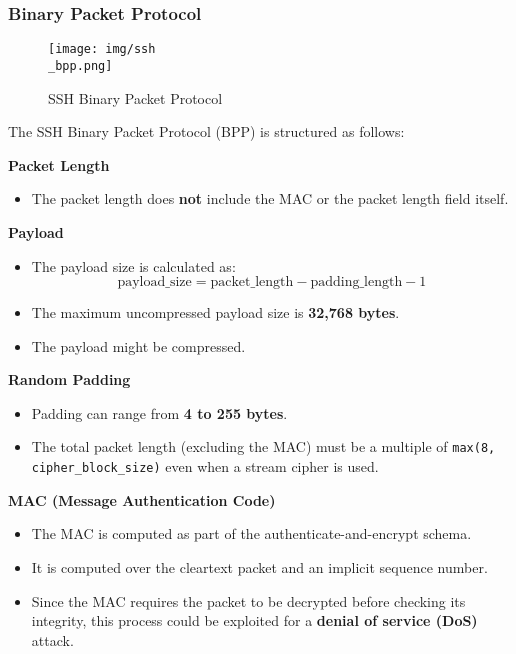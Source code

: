 \subsubsection{Binary Packet Protocol}
\begin{figure}[ht]
    \centering
    \texttt{[image: img/ssh\\\_bpp.png]}
    \caption{SSH Binary Packet Protocol}
    \label{fig:ssh-bpp}
\end{figure}

The SSH Binary Packet Protocol (BPP) is structured as follows:

\textbf{Packet Length}
\begin{itemize}
    \item The packet length does \textbf{not} include the MAC or the packet length field itself.
\end{itemize}

\textbf{Payload}
\begin{itemize}[itemsep=0pt]
    \item The payload size is calculated as:
    \[
    \text{payload\_size} = \text{packet\_length} - \text{padding\_length} - 1
    \]
    \item The maximum uncompressed payload size is \textbf{32,768 bytes}.
    \item The payload might be compressed.
\end{itemize}

\textbf{Random Padding}
\begin{itemize}
    \item Padding can range from \textbf{4 to 255 bytes}.
    \item The total packet length (excluding the MAC) must be a multiple of \texttt{max(8, cipher\_block\_size)} even when a stream cipher is used.
\end{itemize}

\textbf{MAC (Message Authentication Code)}
\begin{itemize}
    \item The MAC is computed as part of the authenticate-and-encrypt schema.
    \item It is computed over the cleartext packet and an implicit sequence number.
    \item Since the MAC requires the packet to be decrypted before checking its integrity, this process could be exploited for a \textbf{denial of service (DoS)} attack.
\end{itemize}


